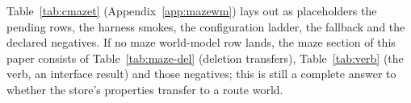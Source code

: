 Table~\ref{tab:cmazet} (Appendix~\ref{app:mazewm}) lays out as placeholders the pending rows,
the harness smokes, the configuration ladder, the fallback and the declared negatives. If no
maze world-model row lands, the maze section of this paper consists of Table~\ref{tab:maze-del}
(deletion transfers), Table~\ref{tab:verb} (the verb, an interface result) and those negatives;
this is still a complete answer to whether the store's properties transfer to a route world.
